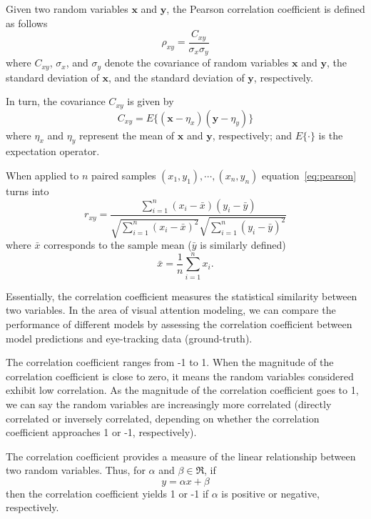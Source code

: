 Given two random variables $\mathbf{x}$ and $\mathbf{y}$, the Pearson correlation coefficient is defined as follows
\begin{equation}
  \rho_{xy} = \frac{C_{xy}}{\sigma_x\sigma_y}
  \label{eq:pearson}
\end{equation}
where $C_{xy}$, $\sigma_x$, and $\sigma_y$ denote the covariance of random variables $\mathbf{x}$ and $\mathbf{y}$, the standard deviation of $\mathbf{x}$, and the standard deviation of $\mathbf{y}$, respectively.

In turn, the covariance $C_{xy}$ is given by
\begin{equation}
  C_{xy} = E\{(\mathbf{x}-\eta_x)(\mathbf{y} - \eta_y)\}
  \label{eq:cov}
\end{equation}
where $\eta_x$ and $\eta_y$ represent the mean of $\mathbf{x}$ and $\mathbf{y}$, respectively; and $E\{\cdot\}$ is the expectation operator.

When applied to $n$ paired samples $(x_1,y_1),\cdots,(x_n,y_n)$ equation~\ref{eq:pearson} turns into
\begin{equation}
  r_{xy} = \frac{\sum_{i=1}^n(x_i-\bar x)(y_i - \bar y)}{\sqrt{\sum_{i=1}^n(x_i-\bar x)^2}\sqrt{\sum_{i=1}^n(y_i-\bar y)^2}}
\end{equation}
where $\bar x$ corresponds to the sample mean ($\bar y$ is similarly defined)
\begin{equation}
  \bar x = \frac{1}{n}\sum_{i=1}^n x_i.
  \label{eq:xsamplemean}
\end{equation}

Essentially, the correlation coefficient measures the statistical similarity between two variables. In the area of visual attention modeling, we can compare the performance of different models by assessing the correlation coefficient between model predictions and eye-tracking data (ground-truth).

The correlation coefficient ranges from -1 to 1. When the magnitude of the correlation coefficient is close to zero, it means the random variables considered exhibit low correlation. As the magnitude of the correlation coefficient goes to 1, we can say the random variables are increasingly more correlated (directly correlated or inversely correlated, depending on whether the correlation coefficient approaches 1 or -1, respectively).

The correlation coefficient provides a measure of the linear relationship between two random variables. Thus, for $\alpha$ and $\beta \in \Re$, if 
\begin{equation}
	y = \alpha x + \beta
	\label{eq:afim}
\end{equation}
then the correlation coefficient yields 1 or -1 if $\alpha$ is positive or negative, respectively.

